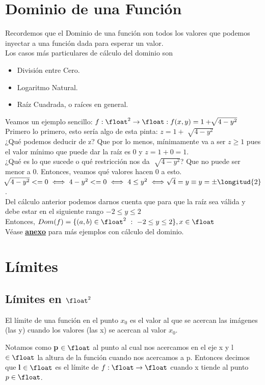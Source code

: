 \documentclass[10pt,a4paper]{article}
\begin{document}
\section*{Dominio de una Función}
Recordemos que el Dominio de una función son todos los valores que podemos inyectar a una función dada para esperar un valor. \\
Los casos más particulares de cálculo del dominio son 
\begin{itemize}
    \item División entre Cero.
    \item Logaritmo Natural. 
    \item Raíz Cuadrada, o raíces en general.
\end{itemize}
Veamos un ejemplo sencillo: $f:\float^{2} \rightarrow \float:f(x,y) = 1 + \sqrt[]{4-y^{2}}$ \\
Primero lo primero, esto sería algo de esta pinta: $z = 1 + \sqrt[]{4-y^{2}}$ \\
¿Qué podemos deducir de z? Que por lo menos, mínimamente va a ser $z \ge 1$ pues el valor mínimo que puede dar la raíz es 0 y $z = 1 + 0 = 1$. \\
¿Qué es lo que sucede o qué restricción nos da $\sqrt[]{4-y^{2}}$? Que no puede ser menor a 0. Entonces, veamos qué valores hacen 0 a esto. \\
$\sqrt[]{4-y^{2}} <= 0 \iff 4-y^{2} <= 0 \iff 4 \le y^{2} \iff \sqrt[]{4} = y \equiv y = \pm \longitud{2}$. \\
Del cálculo anterior podemos darnos cuenta que para que la raíz sea válida y debe estar en el siguiente rango $-2 \le y \le 2$ \\
Entonces, $Dom(f) = \{(a, b) \in \float^{2} \ : \ -2 \le y \le 2\}, x \in \float$ \\
Véase \hyperref[subsec:dominio_funciones]{\underline{\textbf{anexo}}} para más ejemplos con cálculo del dominio.
\section*{Límites}
\subsection*{Límites en $\float^{2}$}
El límite de una función en el punto $x_{0}$ es el valor al que se acercan las imágenes (las y) cuando los valores (las x) se acercan al valor $x_{0}$. 

Notamos como \textbf{p} $\in \float$ al punto al cual nos acercamos en el eje x y l $\in \float$ la altura de la función cuando nos acercamos a p. Entonces decimos que \textbf{l} $\in \float$ es el límite de $f: \float \rightarrow \float$ cuando x tiende al punto $p \in \float$. 
\end{document}
